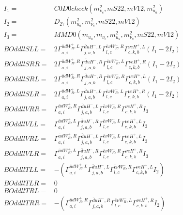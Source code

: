 \documentclass[A4,landscape]{article}
\begin{document}
\begin{align} 
I_1 = & C0D0check(m^2_{\nu_{{c}}}, mS22, mV12, m^2_{u_{{a}}}) \\ 
I_2 = & D_{27}(m^2_{u_{{a}}}, m^2_{\nu_{{c}}}, mS22, mV12) \\ 
I_3 = & MMD0(m_{u_{{a}}}, m_{\nu_{{c}}}, m^2_{u_{{a}}}, m^2_{\nu_{{c}}}, mS22, mV12) \\ 
  BOddllSLL= & 2  \Gamma^{\bar{u}d W_R^+,L}_{a, i} \Gamma^{\bar{d}u H^- ,L}_{j, a, b} \Gamma^{\bar{e}\nu W_R^- ,R}_{l, c} \Gamma^{\nu e H^+,L}_{c, k, b} (I_1 - 2 I_2) \\ 
  BOddllSRR= & 2  \Gamma^{\bar{u}d W_R^+,R}_{a, i} \Gamma^{\bar{d}u H^- ,R}_{j, a, b} \Gamma^{\bar{e}\nu W_R^- ,L}_{l, c} \Gamma^{\nu e H^+,R}_{c, k, b} (I_1 - 2 I_2) \\ 
  BOddllSRL= & 2  \Gamma^{\bar{u}d W_R^+,R}_{a, i} \Gamma^{\bar{d}u H^- ,R}_{j, a, b} \Gamma^{\bar{e}\nu W_R^- ,R}_{l, c} \Gamma^{\nu e H^+,L}_{c, k, b} (I_1 - 2 I_2) \\ 
  BOddllSLR= & 2  \Gamma^{\bar{u}d W_R^+,L}_{a, i} \Gamma^{\bar{d}u H^- ,L}_{j, a, b} \Gamma^{\bar{e}\nu W_R^- ,L}_{l, c} \Gamma^{\nu e H^+,R}_{c, k, b} (I_1 - 2 I_2) \\ 
  BOddllVRR= &  \Gamma^{\bar{u}d W_R^+,R}_{a, i} \Gamma^{\bar{d}u H^- ,L}_{j, a, b} \Gamma^{\bar{e}\nu W_R^- ,R}_{l, c} \Gamma^{\nu e H^+,R}_{c, k, b} I_3 \\ 
  BOddllVLL= &  \Gamma^{\bar{u}d W_R^+,L}_{a, i} \Gamma^{\bar{d}u H^- ,R}_{j, a, b} \Gamma^{\bar{e}\nu W_R^- ,L}_{l, c} \Gamma^{\nu e H^+,L}_{c, k, b} I_3 \\ 
  BOddllVRL= &  \Gamma^{\bar{u}d W_R^+,R}_{a, i} \Gamma^{\bar{d}u H^- ,L}_{j, a, b} \Gamma^{\bar{e}\nu W_R^- ,L}_{l, c} \Gamma^{\nu e H^+,L}_{c, k, b} I_3 \\ 
  BOddllVLR= &  \Gamma^{\bar{u}d W_R^+,L}_{a, i} \Gamma^{\bar{d}u H^- ,R}_{j, a, b} \Gamma^{\bar{e}\nu W_R^- ,R}_{l, c} \Gamma^{\nu e H^+,R}_{c, k, b} I_3 \\ 
  BOddllTLL= & -( \Gamma^{\bar{u}d W_R^+,L}_{a, i} \Gamma^{\bar{d}u H^- ,L}_{j, a, b} \Gamma^{\bar{e}\nu W_R^- ,R}_{l, c} \Gamma^{\nu e H^+,L}_{c, k, b} I_2) \\ 
  BOddllTLR= & 0 \\ 
  BOddllTRL= & 0 \\ 
  BOddllTRR= & -( \Gamma^{\bar{u}d W_R^+,R}_{a, i} \Gamma^{\bar{d}u H^- ,R}_{j, a, b} \Gamma^{\bar{e}\nu W_R^- ,L}_{l, c} \Gamma^{\nu e H^+,R}_{c, k, b} I_2) \\ 
\end{align} 
\end{document}
